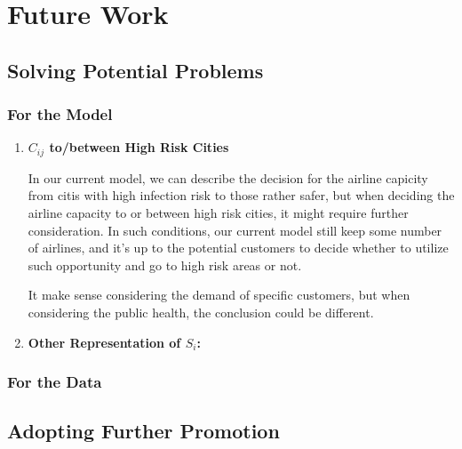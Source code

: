 \section{Future Work}

\subsection{Solving Potential Problems}

\subsubsection{For the Model}

\begin{enumerate}
    \item \textbf{$C_{ij}$ to/between High Risk Cities} 
    
    In our current model, we can describe the decision for the airline capicity from citis with high infection risk to those rather safer, but when deciding the airline capacity to or between high risk cities, it might require further consideration. In such conditions, our current model still keep some number of airlines, and it's up to the potential customers to decide whether to utilize such opportunity and go to high risk areas or not. 
    
    It make sense considering the demand of specific customers, but when considering the public health, the conclusion could be different. 
    \item \textbf{Other Representation of $S_{i}$:}
\end{enumerate}

\subsubsection{For the Data}

\subsection{Adopting Further Promotion}



